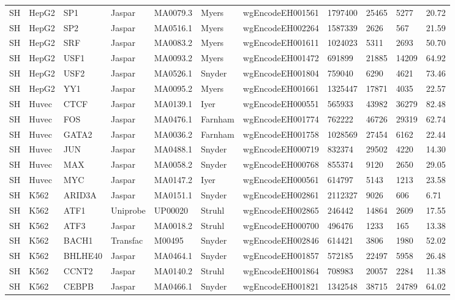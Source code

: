 {\begin{longtable}{p{0.2cm}p{1.1cm}p{1.0cm}p{1.0cm}p{1.0cm}p{1.0cm}p{2.3cm}p{1.0cm}p{0.8cm}p{0.8cm}p{0.8cm}}
SH & HepG2 & SP1 & Jaspar & MA0079.3 & Myers & wgEncodeEH001561 & 1797400 & 25465 & 5277 & 20.72\\
SH & HepG2 & SP2 & Jaspar & MA0516.1 & Myers & wgEncodeEH002264 & 1587339 & 2626 & 567 & 21.59\\
SH & HepG2 & SRF & Jaspar & MA0083.2 & Myers & wgEncodeEH001611 & 1024023 & 5311 & 2693 & 50.70\\
SH & HepG2 & USF1 & Jaspar & MA0093.2 & Myers & wgEncodeEH001472 & 691899 & 21885 & 14209 & 64.92\\
SH & HepG2 & USF2 & Jaspar & MA0526.1 & Snyder & wgEncodeEH001804 & 759040 & 6290 & 4621 & 73.46\\
SH & HepG2 & YY1 & Jaspar & MA0095.2 & Myers & wgEncodeEH001661 & 1325447 & 17871 & 4035 & 22.57\\
SH & Huvec & CTCF & Jaspar & MA0139.1 & Iyer & wgEncodeEH000551 & 565933 & 43982 & 36279 & 82.48\\
SH & Huvec & FOS & Jaspar & MA0476.1 & Farnham & wgEncodeEH001774 & 762222 & 46726 & 29319 & 62.74\\
SH & Huvec & GATA2 & Jaspar & MA0036.2 & Farnham & wgEncodeEH001758 & 1028569 & 27454 & 6162 & 22.44\\
SH & Huvec & JUN & Jaspar & MA0488.1 & Snyder & wgEncodeEH000719 & 832374 & 29502 & 4220 & 14.30\\
SH & Huvec & MAX & Jaspar & MA0058.2 & Snyder & wgEncodeEH000768 & 855374 & 9120 & 2650 & 29.05\\
SH & Huvec & MYC & Jaspar & MA0147.2 & Iyer & wgEncodeEH000561 & 614797 & 5143 & 1213 & 23.58\\
SH & K562 & ARID3A & Jaspar & MA0151.1 & Snyder & wgEncodeEH002861 & 2112327 & 9026 & 606 & 6.71\\
SH & K562 & ATF1 & Uniprobe & UP00020 & Struhl & wgEncodeEH002865 & 246442 & 14864 & 2609 & 17.55\\
SH & K562 & ATF3 & Jaspar & MA0018.2 & Struhl & wgEncodeEH000700 & 496476 & 1233 & 165 & 13.38\\
SH & K562 & BACH1 & Transfac & M00495 & Snyder & wgEncodeEH002846 & 614421 & 3806 & 1980 & 52.02\\
SH & K562 & BHLHE40 & Jaspar & MA0464.1 & Snyder & wgEncodeEH001857 & 572185 & 22497 & 5958 & 26.48\\
SH & K562 & CCNT2 & Jaspar & MA0140.2 & Struhl & wgEncodeEH001864 & 708983 & 20057 & 2284 & 11.38\\
SH & K562 & CEBPB & Jaspar & MA0466.1 & Snyder & wgEncodeEH001821 & 1342548 & 38715 & 24789 & 64.02\\

\end{longtable}}
